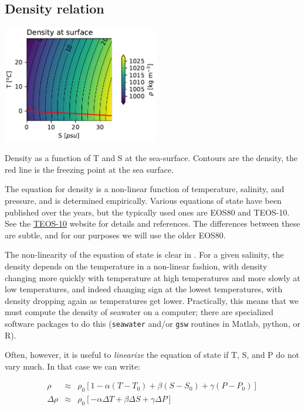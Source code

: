 \subsection{Density relation}


\begin{marginfigure}
    \includegraphics[width=2.7in]{./figs/Density.pdf}
    \caption{Density as a function of T and S at the sea-surface.  Contours are the density, the red line is the freezing point at the sea surface.  }
    \label{fig:Density}  
\end{marginfigure}

The equation for density is a non-linear function of temperature, salinity, and pressure, and is determined empirically.  Various equations of state have been published over the years, but the typically used ones are EOS80 and TEOS-10.  See the \href{http://www.teos-10.org}{TEOS-10} website for details and references.  The differences between these are subtle, and for our purposes we will use the older EOS80.  

The non-linearity of the equation of state is clear in .  For a given salinity, the density depends on the temperature in a non-linear fashion, with density changing more quickly with temperature at high temperatures and more slowly at low temperatures, and indeed changing sign at the lowest temperatures, with density dropping again as temperatures get lower.  Practically, this means that we must compute the density of seawater on a computer; there are specialized software packages to do this (\texttt{seawater} and/or \texttt{gsw} routines in Matlab, python, or R).

Often, however, it is useful to \emph{linearize} the equation of state if T, S, and P do not vary much.  In that case we can write:

\begin{eqnarray*}
    \rho & \approx & \rho_0 \left[ 1 - \alpha \left(T - T_0\right) + \beta \left(S - S_0\right) + \gamma \left(P - P_0\right)\right]\\
    \Delta \rho & \approx & \rho_0\left[- \alpha \Delta T + \beta \Delta S + \gamma \Delta P\right]
\end{eqnarray*}


